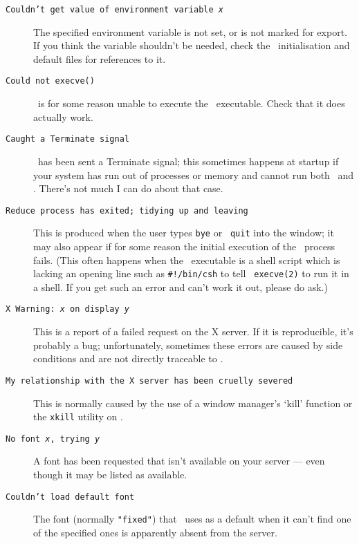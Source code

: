 \begin{description}
\item[{\tt Couldn't get value of environment variable~{\it x}}]\hskip
0.6pc\relax The specified environment variable is not set, or is not
marked for export.  If you think the variable shouldn't be needed,
check the \xr\ initialisation and default files for references to it.

\item[{\tt Could not execve()}]\hskip 0.6pc\relax \xr\ is for some
reason unable to execute the \REDUCE\ executable.  Check that it does
actually work.

\item[{\tt Caught a Terminate signal}]\hskip 0.6pc\relax \xr\ has been
sent a Terminate signal; this sometimes happens at startup if your
system has run out of processes or memory and cannot run both \xr\ and
\REDUCE.  There's not much I can do about that case.

\item[{\tt Reduce process has exited;~tidying up and leaving}]\hskip
0.6pc\relax This is produced when the user types {\tt bye} or {\tt
quit} into the \REDUCE{} window; it may also appear if for some reason
the initial execution of the \REDUCE\ process fails.  (This often
happens when the \REDUCE\ executable is a shell script which is
lacking an opening line such as {\tt \#!/bin/csh} to tell {\tt
execve(2)} to run it in a shell.  If you get such an error and can't
work it out, please do ask.)

\item[{\tt X Warning:~{\it x\/} on display {\it y\/}}]\hskip
0.6pc\relax This is a report of a failed request on the X server.  If
it is reproducible, it's probably a bug; unfortunately, sometimes
these errors are caused by side conditions and are not directly
traceable to \xr.

\item[{\tt My relationship with the X server has been cruelly
severed}]\hskip 0.6pc\relax This is normally caused by the use of a
window manager's `kill' function or the {\tt xkill} utility on \xr.

\item[{\tt No font~{\it x\/}, trying~{\it y}}]\hskip 0.6pc\relax A
font has been requested that isn't available on your server --- even
though it may be listed as available.

\item[{\tt Couldn't load default font}]\hskip 0.6pc\relax The font
(normally {\tt\verb+"+fixed\verb+"+}) that \xr\ uses as a default when
it can't find one of the specified ones is apparently absent from the
server.


\end{description}
